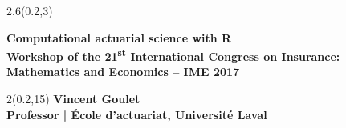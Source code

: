 \begingroup

\textblockorigin{0mm}{0mm}
\begin{frame}[plain]
  \begin{textblock*}{2.6\TPHorizModule}(0.2\TPHorizModule,3\TPVertModule)
    \raggedright%
    \bfseries
    \fontsize{22}{22}\selectfont
    Computational actuarial science with R \\
    \mdseries
    \fontsize{12}{13}\selectfont
    Workshop of the 21\textsuperscript{st} International Congress on
    Insurance: \\ Mathematics and Economics -- IME 2017
  \end{textblock*}

  \begin{textblock*}{2\TPHorizModule}(0.2\TPHorizModule,15\TPVertModule)
    \fontsize{10}{11}\selectfont
    \bfseries
    Vincent Goulet \\
    \fontsize{9}{11}\selectfont
    \mdseries
    Professor | École d'actuariat, Université Laval
  \end{textblock*}
\end{frame}
\endgroup

